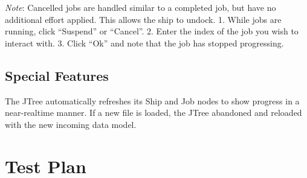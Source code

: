 \documentclass[english,floatsintext,man]{apa6}
\begin{document}
\emph{Note}: Cancelled jobs are handled similar to a completed job, but
have no additional effort applied. This allows the ship to undock. 1.
While jobs are running, click \enquote{Suspend} or \enquote{Cancel}. 2.
Enter the index of the job you wish to interact with. 3. Click
\enquote{Ok} and note that the job has stopped progressing.

\subsection{Special Features}\label{special-features}

The JTree automatically refreshes its Ship and Job nodes to show
progress in a near-realtime manner. If a new file is loaded, the JTree
abandoned and reloaded with the new incoming data model.

\section{Test Plan}\label{test-plan}
\end{document}
